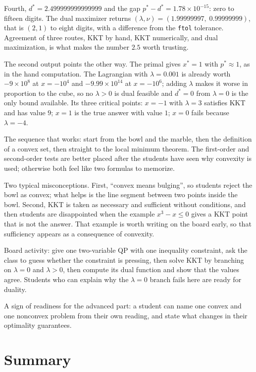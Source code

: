 Fourth, $d^{*}=2.499999999999999$ and the gap $p^{*}-d^{*}=1.78\times10^{-15}$: zero to fifteen
digits. The dual maximizer returns $(\lambda,\nu)=(1.99999997,\;0.99999999)$, that is $(2,1)$ to
eight digits, with a difference from the \texttt{ftol} tolerance. Agreement of three routes, KKT
by hand, KKT numerically, and dual maximization, is what makes the number $2.5$ worth trusting.

The second output points the other way. The primal gives $x^{*}=1$ with $p^{*}\approx1$, as in
the hand computation. The Lagrangian with $\lambda=0.001$ is already worth $-9\times10^{8}$ at
$x=-10^{4}$ and $-9.99\times10^{14}$ at $x=-10^{6}$; adding $\lambda$ makes it worse in
proportion to the cube, so no $\lambda>0$ is dual feasible and $d^{*}=0$ from $\lambda=0$ is the
only bound available. Its three critical points: $x=-1$ with $\lambda=3$ satisfies KKT and has
value $9$; $x=1$ is the true answer with value $1$; $x=0$ fails because $\lambda=-4$.

\begin{untukdosen}
The sequence that works: start from the bowl and the marble, then the definition of a convex set,
then straight to the local minimum theorem. The first-order and second-order tests are better
placed after the students have seen why convexity is used; otherwise both feel like two formulas
to memorize.

Two typical misconceptions. First, ``convex means bulging'', so students reject the bowl as
convex; what helps is the line segment between two points inside the bowl. Second, KKT is taken
as necessary and sufficient without conditions, and then students are disappointed when the
example $x^{3}-x\le0$ gives a KKT point that is not the answer. That example is worth writing on
the board early, so that sufficiency appears as a consequence of convexity.

Board activity: give one two-variable QP with one inequality constraint, ask the class to guess
whether the constraint is pressing, then solve KKT by branching on $\lambda=0$ and $\lambda>0$,
then compute its dual function and show that the values agree. Students who can explain why the
$\lambda=0$ branch fails here are ready for duality.

A sign of readiness for the advanced part: a student can name one convex and one nonconvex
problem from their own reading, and state what changes in their optimality guarantees.
\end{untukdosen}

\section{Summary}

